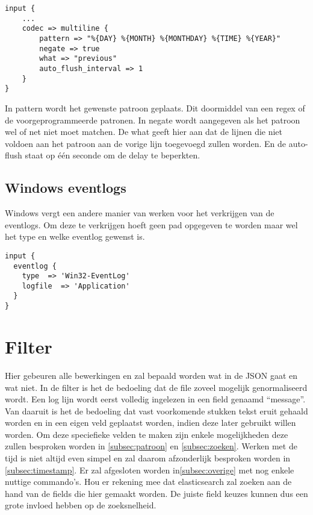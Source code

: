 \lstset{escapechar=@,style=customc}  
\begin{lstlisting}[frame=single]  
input {
	...
	codec => multiline {
		pattern => "%{DAY} %{MONTH} %{MONTHDAY} %{TIME} %{YEAR}"
		negate => true
		what => "previous"
		auto_flush_interval => 1
	}
}
\end{lstlisting}

In pattern wordt het gewenste patroon geplaats. Dit doormiddel van een regex of de voorgeprogrammeerde patronen. In negate wordt aangegeven als het patroon wel of net niet moet matchen. De what geeft hier aan dat de lijnen die niet voldoen aan het patroon aan de vorige lijn toegevoegd zullen worden. En de auto-flush staat op één seconde om de delay te beperkten.


\subsection{Windows eventlogs}
\label{subsec:windows-eventlogs}

Windows vergt een andere manier van werken voor het verkrijgen van de eventlogs. Om deze te verkrijgen hoeft geen pad opgegeven te worden maar wel het type en welke eventlog gewenst is. 

\lstset{escapechar=@,style=customc}  
\begin{lstlisting}[frame=single]  
input {
  eventlog {
    type  => 'Win32-EventLog'
    logfile  => 'Application'
  }
}
\end{lstlisting}

\section{Filter}
\label{sec:filter}

Hier gebeuren alle bewerkingen en zal bepaald worden wat in de JSON gaat en wat niet. In de filter is het de bedoeling dat de file zoveel mogelijk genormaliseerd wordt. Een log lijn wordt eerst volledig ingelezen in een field  genaamd “message”. Van daaruit is het de bedoeling dat vast voorkomende stukken tekst eruit gehaald worden en in een eigen veld geplaatst worden, indien deze later gebruikt willen worden.  Om deze speciefieke velden te maken zijn enkele mogelijkheden deze zullen besproken worden in \ref{subsec:patroon} en \ref{subsec:zoeken}. Werken met de tijd is niet altijd even simpel en zal daarom afzonderlijk besproken worden in \ref{subsec:timestamp}. Er zal afgesloten worden in\ref{subsec:overige} met nog enkele nuttige commando’s. 
Hou er rekening mee dat elasticsearch zal zoeken aan de hand van de fields die hier gemaakt worden. De juiste field keuzes kunnen dus een grote invloed hebben op de zoeksnelheid.


